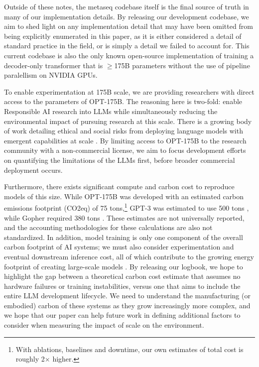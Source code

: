 \documentclass[11pt]{article}
\newcommand{\OPT}[0]{{OPT-175B}}
\newcommand{\biggpt}[1]{{GPT-3#1}}
\begin{document}
Outside of these notes, the metaseq codebase itself is the final source of truth in many of our implementation details.  By releasing our development codebase, we aim to shed light on any implementation detail that may have been omitted from being explicitly enumerated in this paper, as it is either considered a detail of standard practice in the field, or is simply a detail we failed to account for.  This current codebase is also the only known open-source implementation of training a decoder-only transformer that is $\geq$175B parameters without the use of pipeline paralellism on NVIDIA GPUs.

To enable experimentation at 175B scale, we are providing researchers with direct access to the parameters of \OPT{}. The reasoning here is two-fold: enable Responsible AI research into LLMs while simultaneously reducing the environmental impact of pursuing research at this scale.  There is a growing body of work detailing ethical and social risks from deploying language models with emergent capabilities at scale \cite{deepmindLMrisks2021,foundation2021,dinan2021anticipating,alignmentagents2021}. By limiting access to \OPT{} to the research community with a non-commercial license, we aim to focus development efforts on quantifying the limitations of the LLMs first, before broader commercial deployment occurs.
 
Furthermore, there exists significant compute and carbon cost to reproduce models of this size.  While \OPT{} was developed with an estimated carbon emissions footprint (CO2eq) of 75 tons,\footnote{With ablations, baselines and downtime, our own estimates of total cost is roughly 2$\times$ higher.} \biggpt{} was estimated to use 500 tons \cite{patterson2021carbon}, while Gopher required 380 tons \cite{gopher2022}.  These estimates are not universally reported, and the accounting methodologies for these calculations are also not standardized. In addition, model training is only one component of the overall carbon footprint of AI systems; we must also consider experimentation and eventual downstream inference cost, all of which contribute to the growing energy footprint of creating large-scale models \cite{sustainable_ai2021}.  By releasing our logbook, we hope to highlight the gap between a theoretical carbon cost estimate that assumes no hardware failures or training instabilities, versus one that aims to include the entire LLM development lifecycle.  We need to understand the manufacturing (or embodied) carbon of these systems \cite{gupta2021chasing} as they grow increasingly more complex, and we hope that our paper can help future work in defining additional factors to consider when measuring the impact of scale on the environment.
\end{document}
